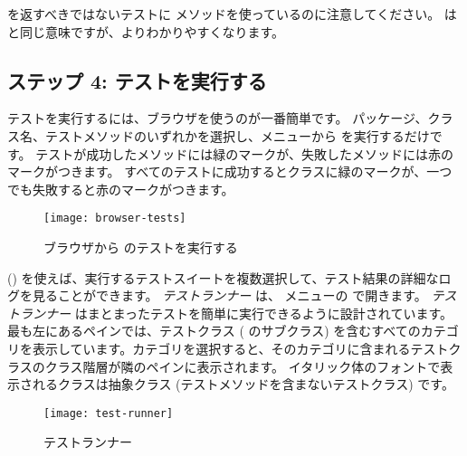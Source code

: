 \documentclass[a4paper,10pt,twoside]{book}
\begin{document}
\noindent
{} を返すべきではないテストに  メソッドを使っているのに注意してください。
 は  と同じ意味ですが、よりわかりやすくなります。

\subsection{ステップ 4: テストを実行する}

テストを実行するには、ブラウザを使うのが一番簡単です。
パッケージ、クラス名、テストメソッドのいずれかを選択し、メニューから  を実行するだけです。
テストが成功したメソッドには緑のマークが、失敗したメソッドには赤のマークがつきます。
すべてのテストに成功するとクラスに緑のマークが、一つでも失敗すると赤のマークがつきます。

\begin{figure}[tbh]
  \begin{center}
	\texttt{[image: browser-tests]}
	\caption{ブラウザから \sunit のテストを実行する}
  \end{center}
\end{figure}


\sunit {} () を使えば、実行するテストスイートを複数選択して、テスト結果の詳細なログを見ることができます。
\emph{テストランナー} は、  メニューの  で開きます。
\emph{テストランナー} はまとまったテストを簡単に実行できるように設計されています。
最も左にあるペインでは、テストクラス (\ie {} のサブクラス) を含むすべてのカテゴリを表示しています。カテゴリを選択すると、そのカテゴリに含まれるテストクラスのクラス階層が隣のペインに表示されます。
イタリック体のフォントで表示されるクラスは抽象クラス (テストメソッドを含まないテストクラス) です。


\begin{figure}[tbh]
  \begin{center}
	\texttt{[image: test-runner]}
	\caption{\pharo \sunit テストランナー}
  \end{center}
\end{figure}
\end{document}
